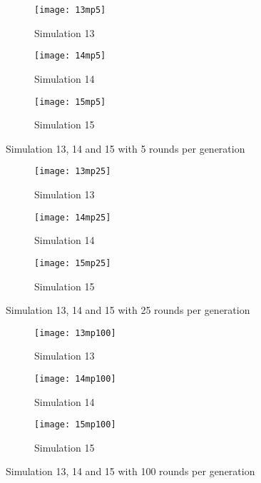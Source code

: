 \begin{figure}[H]       
    \centering
    \begin{subfigure}[b]{0.3\textwidth}
	\centering
	{\texttt{[image: 13mp5]}}   
    	\caption{Simulation 13}
	\label{fig:mpsim135}
    \end{subfigure}
    \hfill
    \begin{subfigure}[b]{0.3\textwidth}
	\centering
	{\texttt{[image: 14mp5]}}   
    	\caption{Simulation 14}
	\label{fig:mpsim145}
    \end{subfigure}
    \hfill
    \begin{subfigure}[b]{0.3\textwidth}
	\centering
	{\texttt{[image: 15mp5]}}   
    	\caption{Simulation 15}
	\label{fig:mpsim155}
    \end{subfigure}
    \caption{Simulation 13, 14 and 15 with 5 rounds per generation}
    \label{mpsim131415simulations5}
\end{figure}

\begin{figure}[H]       
    \centering
    \begin{subfigure}[b]{0.3\textwidth}
	\centering
	{\texttt{[image: 13mp25]}}   
    	\caption{Simulation 13}
	\label{fig:mpsim1325}
    \end{subfigure}
    \hfill
    \begin{subfigure}[b]{0.3\textwidth}
	\centering
	{\texttt{[image: 14mp25]}}   
    	\caption{Simulation 14}
	\label{fig:mpsim1425}
    \end{subfigure}
    \hfill
    \begin{subfigure}[b]{0.3\textwidth}
	\centering
	{\texttt{[image: 15mp25]}}   
    	\caption{Simulation 15}
	\label{fig:mpsim1525}
    \end{subfigure}
    \caption{Simulation 13, 14 and 15 with 25 rounds per generation}
    \label{mpsim131415simulations25}
\end{figure}

\begin{figure}[H]       
    \centering
    \begin{subfigure}[b]{0.3\textwidth}
	\centering
	{\texttt{[image: 13mp100]}}   
    	\caption{Simulation 13}
	\label{fig:mpsim13100}
    \end{subfigure}
    \hfill
    \begin{subfigure}[b]{0.3\textwidth}
	\centering
	{\texttt{[image: 14mp100]}}   
    	\caption{Simulation 14}
	\label{fig:mpsim14100}
    \end{subfigure}
    \hfill
    \begin{subfigure}[b]{0.3\textwidth}
	\centering
	{\texttt{[image: 15mp100]}}   
    	\caption{Simulation 15}
	\label{fig:mpsim15100}
    \end{subfigure}
    \caption{Simulation 13, 14 and 15 with 100 rounds per generation}
    \label{mpsim131415simulations100}
\end{figure}

